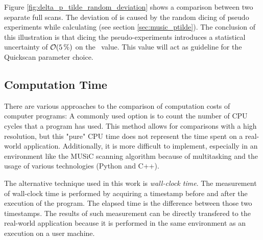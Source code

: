 Figure \ref{fig:delta_p_tilde_random_deviation} shows a comparison between two separate full scans. The deviation of \sigmarel is caused by the random dicing of pseudo experiments while calculating \ptilde (see section \ref{sec:music_ptilde}). The conclusion of this illustration is that dicing the pseudo-experiments introduces a statistical uncertainty of $\order{\SI{5}{\percent}}$ on the \ptilde~value. This value will act as guideline for the Quickscan parameter choice.

\subsection{Computation Time}
There are various approaches to the comparison of computation costs of computer programs: A commonly used option is to count the number of CPU cycles that a program has used. This method allows for comparisons with a high resolution, but this "pure" CPU time does not represent the time spent on a real-world application. Additionally, it is more difficult to implement, especially in an environment like the MUSiC scanning algorithm because of multitasking and the usage of various technologies (Python and C++). 

The alternative technique used in this work is \emph{wall-clock time}. The measurement of wall-clock time is performed by acquiring a timestamp before and after the execution of the program. The elapsed time is the difference between those two timestamps. The results of such measurement can be directly transfered to the real-world application because it is performed in the same environment as an execution on a user machine.

